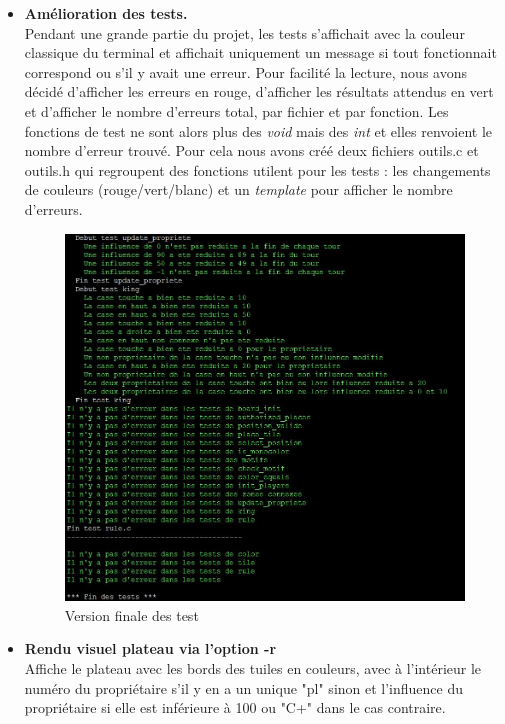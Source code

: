 \documentclass[a4paper]{article}
\begin{document}
\begin{itemize}
    \item \textbf{Amélioration des tests.}\\ Pendant une grande partie du projet, les tests s'affichait avec la couleur classique du terminal et affichait uniquement un message si tout fonctionnait correspond ou s'il y avait une erreur. Pour facilité la lecture, nous avons décidé d'afficher les erreurs en rouge, d'afficher les résultats attendus en vert et d'afficher le nombre d'erreurs total, par fichier et par fonction. Les fonctions de test ne sont alors plus des \emph{void} mais des \emph{int} et elles renvoient le nombre d'erreur trouvé. Pour cela nous avons créé deux fichiers outils.c et outils.h qui regroupent des fonctions utilent pour les tests : les changements de couleurs (rouge/vert/blanc) et un \emph{template} pour afficher le nombre d'erreurs.\\
    \begin{figure}[h!]
        \centering
        \includegraphics[scale = 0.75]{testV2.jpg}
      
        \caption{Version finale des test}
        \label{testV2}
    \end{figure}
    \newpage
    
  \item \textbf{Rendu visuel plateau via l'option -r } \\
Affiche le plateau avec les bords des tuiles en couleurs, avec à l'intérieur le numéro du propriétaire s'il y en a un unique "pl" sinon et l'influence du propriétaire si elle est inférieure à 100 ou "C+" dans le cas contraire. \\
    

\end{itemize}
\end{document}
